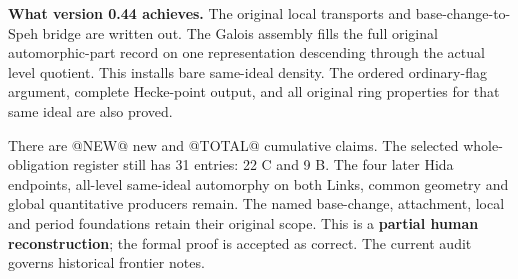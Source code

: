 \textbf{What version 0.44 achieves.}
The original local transports and base-change-to-Speh bridge are
written out.  The Galois assembly fills the full original
automorphic-part record on one representation descending through
the actual level quotient.  This installs bare same-ideal density.
The ordered ordinary-flag argument, complete Hecke-point output,
and all original ring properties for that same ideal are also proved.

There are @NEW@ new and @TOTAL@ cumulative claims.  The selected
whole-obligation register still has 31 entries: 22 C and 9 B.
The four later Hida endpoints, all-level same-ideal automorphy on
both Links, common geometry and global quantitative producers
remain.  The named base-change, attachment, local and period
foundations retain their original scope.
This is a \textbf{partial human reconstruction}; the formal proof
is accepted as correct.  The current audit governs historical
frontier notes.
